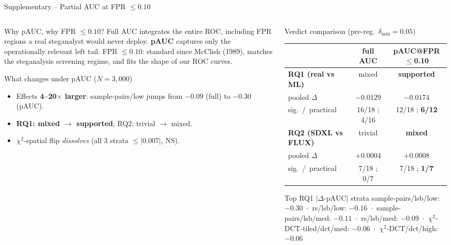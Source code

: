 \documentclass[aspectratio=169,11pt]{beamer}
\begin{document}
\begin{frame}{Supplementary -- Partial AUC at FPR $\leq 0.10$}
\scriptsize
\begin{columns}[T]
\begin{column}{0.42\textwidth}
\begin{block}{Why pAUC, why FPR $\leq 0.10$?}
Full AUC integrates the entire ROC, including FPR regions a real steganalyst would never deploy. \textbf{pAUC} captures only the operationally relevant left tail. FPR $\leq 0.10$: standard since McClish (1989), matches the steganalysis screening regime, and fits the shape of our ROC curves.
\end{block}
\begin{exampleblock}{What changes under pAUC ($N\!=\!3{,}000$)}
\begin{itemize}\setlength{\itemsep}{1pt}
\item Effects \textbf{4--20$\times$ larger}: sample-pairs/low jumps from $-0.09$ (full) to $\boldsymbol{-0.30}$ (pAUC).
\item \textbf{RQ1: mixed $\to$ supported}; RQ2: trivial $\to$ mixed.
\item $\chi^2$-spatial flip \emph{dissolves} (all 3 strata $\leq|0.007|$, NS).
\end{itemize}
\end{exampleblock}
\end{column}
\begin{column}{0.54\textwidth}
\begin{block}{Verdict comparison (pre-reg.\ $\delta_\text{min}\!=\!0.05$)}
\centering\renewcommand{\arraystretch}{1.0}
\begin{tabular}{l@{\hskip 6pt}c@{\hskip 6pt}c}
& \textbf{full AUC} & \textbf{pAUC@FPR$\leq$0.10} \\
\midrule
\textbf{RQ1 (real vs ML)}   & mixed  & \textbf{supported} \\
\quad pooled $\Delta$    & $-0.0129$ & $-0.0174$ \\
\quad sig.~/~practical   & 16/18 ; 4/16 & 12/18 ; \textbf{6/12} \\
\midrule
\textbf{RQ2 (SDXL vs FLUX)} & trivial & \textbf{mixed} \\
\quad pooled $\Delta$    & $+0.0004$ & $+0.0008$ \\
\quad sig.~/~practical   & 7/18 ; 0/7 & 7/18 ; \textbf{1/7} \\
\end{tabular}
\end{block}
\begin{block}{Top RQ1 $|\Delta\text{-pAUC}|$ strata}
\scriptsize sample-pairs/lsb/low: $\boldsymbol{-0.30}$ \,$\cdot$\, rs/lsb/low: $-0.16$ \,$\cdot$\, sample-pairs/lsb/med: $-0.11$ \,$\cdot$\, rs/lsb/med: $-0.09$ \,$\cdot$\, $\chi^2$-DCT-tiled/dct/med: $-0.06$ \,$\cdot$\, $\chi^2$-DCT/dct/high: $-0.06$
\end{block}
\end{column}
\end{columns}
\end{frame}
\end{document}
